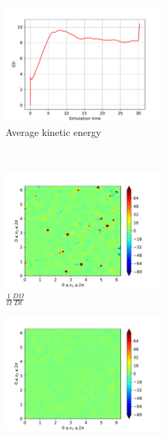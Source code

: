 \begin{figure}[H]
    \begin{subfigure}[H]{0.45\textwidth}
        \includegraphics[height=1.75in]{media/run-cds-65/enst-average1360}
        \caption{Average kinetic energy}
    \end{subfigure}
    ~
    \begin{subfigure}[H]{0.45\textwidth}
        \includegraphics[height=1.75in]{media/run-cds-65/enst-1360}
        \caption{$\frac{1}{\Omega} \frac{D \Omega}{Dt}$}
    \end{subfigure}
    \newline
    \begin{subfigure}{0.45\textwidth}
        \includegraphics[height=1.75in]{media/run-cds-65/A-enst-1360}

\end{subfigure}
\end{figure}
